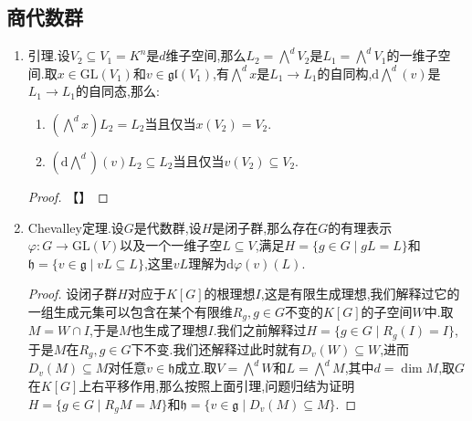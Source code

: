 \subsection{商代数群}

\begin{enumerate}
	\item 引理.设$V_2\subseteq V_1=K^n$是$d$维子空间,那么$L_2=\bigwedge^dV_2$是$L_1=\bigwedge^dV_1$的一维子空间.取$x\in\mathrm{GL}(V_1)$和$v\in\mathfrak{gl}(V_1)$,有$\bigwedge^dx$是$L_1\to L_1$的自同构,$\mathrm{d}\bigwedge^d(v)$是$L_1\to L_1$的自同态,那么:
	\begin{enumerate}[(1)]
		\item $(\bigwedge^dx)L_2=L_2$当且仅当$x(V_2)=V_2$.
		\item $(\mathrm{d}\bigwedge^d)(v)L_2\subseteq L_2$当且仅当$v(V_2)\subseteq V_2$.
	\end{enumerate}
    \begin{proof}
    	
    	【】
    \end{proof}
    \item Chevalley定理.设$G$是代数群,设$H$是闭子群,那么存在$G$的有理表示$\varphi:G\to\mathrm{GL}(V)$以及一个一维子空$L\subseteq V$,满足$H=\{g\in G\mid gL=L\}$和$\mathfrak{h}=\{v\in\mathfrak{g}\mid vL\subseteq L\}$,这里$vL$理解为$\mathrm{d}\varphi(v)(L)$.
    \begin{proof}
    	
    	设闭子群$H$对应于$K[G]$的根理想$I$,这是有限生成理想,我们解释过它的一组生成元集可以包含在某个有限维$R_g,g\in G$不变的$K[G]$的子空间$W$中.取$M=W\cap I$,于是$M$也生成了理想$I$.我们之前解释过$H=\{g\in G\mid R_g(I)=I\}$,于是$M$在$R_g,g\in G$下不变.我们还解释过此时就有$D_v(W)\subseteq W$,进而$D_v(M)\subseteq M$对任意$v\in\mathfrak{h}$成立.取$V=\bigwedge^dW$和$L=\bigwedge^dM$,其中$d=\dim M$,取$G$在$K[G]$上右平移作用,那么按照上面引理,问题归结为证明$H=\{g\in G\mid R_gM=M\}$和$\mathfrak{h}=\{v\in\mathfrak{g}\mid D_v(M)\subseteq M\}$.
    	
    	\qquad
    	

\end{proof}
\end{enumerate}
